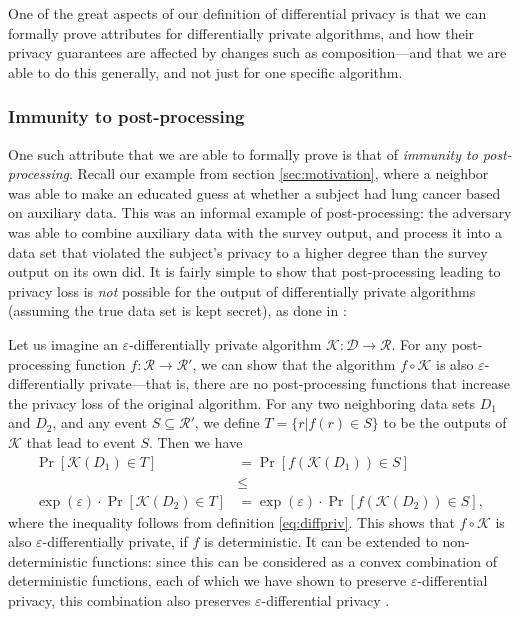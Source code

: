 \documentclass[12pt]{article}
\newcommand{\fancy}{\mathcal}
\renewcommand{\epsilon}{\varepsilon}
\begin{document}
One of the great aspects of our definition of differential privacy is that we can formally prove attributes for differentially private algorithms, and how their privacy guarantees are affected by changes such as composition---and that we are able to do this generally, and not just for one specific algorithm.

\subsubsection{Immunity to post-processing}

One such attribute that we are able to formally prove is that of \emph{immunity to post-processing}. Recall our example from section \ref{sec:motivation}, where a neighbor was able to make an educated guess at whether a subject had lung cancer based on auxiliary data. This was an informal example of post-processing: the adversary was able to combine auxiliary data with the survey output, and process it into a data set that violated the subject's privacy to a higher degree than the survey output on its own did. It is fairly simple to show that post-processing leading to privacy loss is \emph{not} possible for the output of differentially private algorithms (assuming the true data set is kept secret), as done in \cite{dwork_privacybook}:

Let us imagine an $\epsilon$-differentially private algorithm $\fancy{K} : \fancy{D} \to \fancy{R}$. For any post-processing function $f : \fancy{R} \to \fancy{R}'$, we can show that the algorithm $f \circ \fancy{K}$ is also $\epsilon$-differentially private---that is, there are no post-processing functions that increase the privacy loss of the original algorithm. For any two neighboring data sets $D_1$ and $D_2$, and any event $S \subseteq \fancy{R}'$, we define $T = \{r|f(r) \in S\}$ to be the outputs of $\fancy{K}$ that lead to event $S$. Then we have
\begin{align*}
    \Pr[\fancy{K}(D_1) \in T] &= \Pr[f(\fancy{K}(D_1)) \in S]  \\
    &\leq \\
    \exp(\epsilon)\cdot\Pr[\fancy{K}(D_2) \in T] &= \exp(\epsilon)\cdot\Pr[f(\fancy{K}(D_2)) \in S],
\end{align*}
where the inequality follows from definition \ref{eq:diffpriv}. This shows that $f \circ \fancy{K}$ is also $\epsilon$-differentially private, if $f$ is deterministic. It can be extended to non-deterministic functions: since this can be considered as a convex combination of deterministic functions, each of which we have shown to preserve $\epsilon$-differential privacy, this combination also preserves $\epsilon$-differential privacy \cite[sec.~2.3]{dwork_privacybook}.
\end{document}
